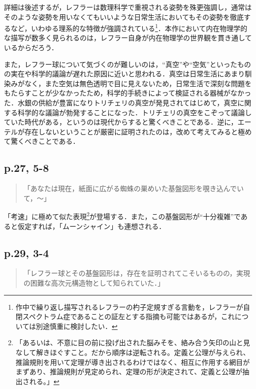 \documentclass[10pt, a5paper, twoside]{jsarticle}
\theoremstyle{definition}
\begin{document}
                詳細は後述するが，レフラーは数理科学で重視される姿勢を殊更強調し，通常はそのような姿勢を用いなくてもいいような日常生活においてもその姿勢を徹底するなど，いわゆる理系的な特徴が強調されている\footnote{作中で繰り返し描写されるレフラーの杓子定規すぎる言動を，レフラーが自閉スペクトラム症であることの証左とする指摘も可能ではあるが，これについては別途慎重に検討したい．}．本作において内在物理学的な描写が数多く見られるのは，レフラー自身が内在物理学の世界観を貫き通しているからだろう．

                また，レフラー球について気づくのが難しいのは，“真空”や“空気”といったものの実在や科学的議論が遅れた原因に近いと思われる．真空は日常生活にあまり馴染みがなく，また空気は無色透明で目に見えないため，日常生活で深刻な問題をもたらすことが少なかったため，科学的手続きによって検証される器械がなかった．水銀の供給が豊富になりトリチェリの真空が発見されてはじめて，真空に関する科学的な議論が勃発することになった．トリチェリの真空をこぞって議論していた時代がある，というのは現代からすると驚くべきことである．逆に，エーテルが存在しないということが厳密に証明されたのは，改めて考えてみると極めて驚くべきことである．

            \subsection{p.27, 5-8}

                \begin{quote}

                    「あなたは現在，紙面に広がる蜘蛛の巣めいた基盤図形を覗き込んでいて，〜」

                \end{quote}

                「考速」に極めて似た表現\footnote{「あるいは、不意に目の前に投げ出された脳みそを、絡み合う矢印の山と見なして解きほぐすこと。だから順序は逆転される。定義と公理が与えられ、推論規則を用いて定理が導き出されるわけではなく、相互に作用する網目がまずあり、推論規則が見定められ、定理の形が決定されて、定義と公理が抽出される。」\cite{goto}}が登場する．また，この基盤図形が“十分複雑”であると仮定すれば，「ムーンシャイン」も連想される．

            \subsection{p.29, 3-4}

                \begin{quote}

                    「レフラー球とその基盤図形は，存在を証明されてこそいるものの，実現の困難な高次元構造物として知られていた．」

                \end{quote}
\end{document}
